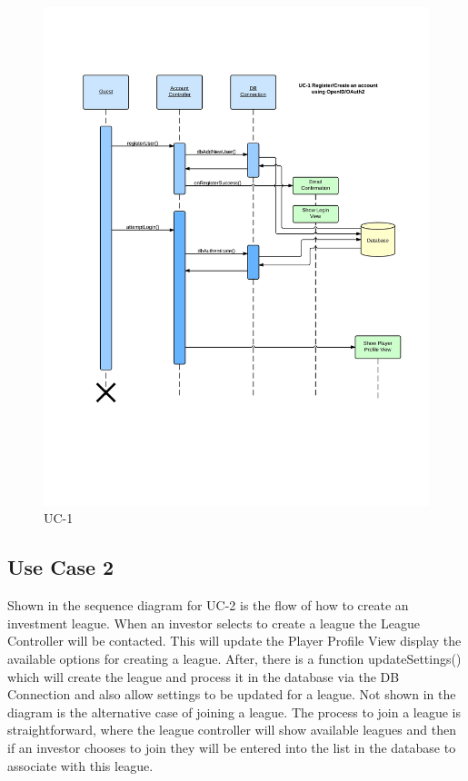 \begin{figure}[H]
\centering
\includegraphics[width=5.5in]{./img/inter/uc1.jpg}
\caption{UC-1}
\end{figure}

\subsection{Use Case 2}
Shown in the sequence diagram for UC-2 is the flow of how to create an
investment league. When an investor selects to create a league the League
Controller will be contacted. This will update the Player Profile View display
the available options for creating a league. After, there is a function
updateSettings() which will create the league and process it in the database
via the DB Connection and also allow settings to be updated for a league. Not
shown in the diagram is the alternative case of joining a league. The process
to join a league is straightforward, where the league controller will show
available leagues and then if an investor chooses to join they will be entered
into the list in the database to associate with this league.

